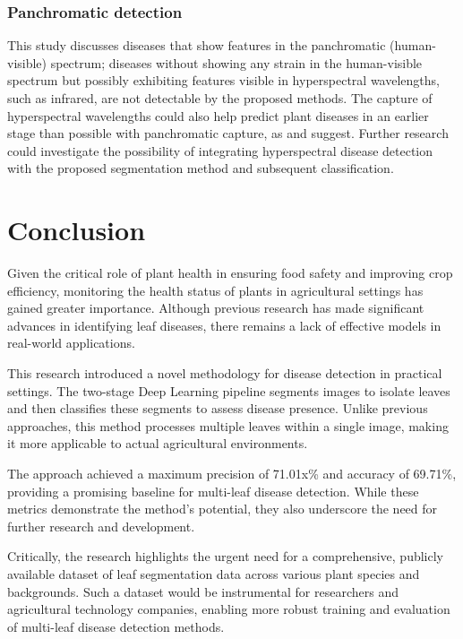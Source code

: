 \documentclass[draft,final]{vutinfth} %
\begin{document}
\subsection{Panchromatic detection} 
This study discusses diseases that show features in the panchromatic (human-visible) spectrum; diseases without showing any strain in the human-visible spectrum but possibly exhibiting features visible in hyperspectral wavelengths, such as infrared, are not detectable by the proposed methods. 
The capture of hyperspectral wavelengths could also help predict plant diseases in an earlier stage than possible with panchromatic capture, as \cite{lowe_hyperspectral_2017} and \cite{wan_hyperspectral_2022} suggest. Further research could investigate the possibility of integrating hyperspectral disease detection with the proposed segmentation method and subsequent classification. 

\chapter{Conclusion}
Given the critical role of plant health in ensuring food safety and improving crop efficiency, monitoring the health status of plants in agricultural settings has gained greater importance. Although previous research has made significant advances in identifying leaf diseases, there remains a lack of effective models in real-world applications.

This research introduced a novel methodology for disease detection in practical settings. The two-stage Deep Learning pipeline segments images to isolate leaves and then classifies these segments to assess disease presence. Unlike previous approaches, this method processes multiple leaves within a single image, making it more applicable to actual agricultural environments.

The approach achieved a maximum precision of 71.01x\% and accuracy of 69.71\%, providing a promising baseline for multi-leaf disease detection. While these metrics demonstrate the method's potential, they also underscore the need for further research and development.

Critically, the research highlights the urgent need for a comprehensive, publicly available dataset of leaf segmentation data across various plant species and backgrounds. Such a dataset would be instrumental for researchers and agricultural technology companies, enabling more robust training and evaluation of multi-leaf disease detection methods.
\end{document}
